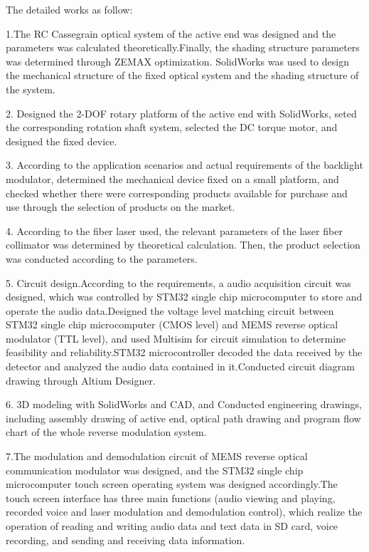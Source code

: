The detailed works as follow:

1.The RC Cassegrain  optical system of the active end was designed and the parameters was calculated theoretically.Finally, the shading structure parameters was determined through ZEMAX optimization. SolidWorks was used to design the mechanical structure of the fixed optical system and the shading structure of the system.

2. Designed the 2-DOF rotary platform of the active end with SolidWorks, seted the corresponding rotation shaft system, selected the DC torque motor, and designed the fixed device.

3. According to the application scenarios and actual requirements of the backlight modulator, determined the mechanical device fixed on a small platform, and checked whether there were corresponding products available for purchase and use through the selection of products on the market. 


4. According to the fiber laser used, the relevant parameters of the laser fiber collimator was determined by theoretical calculation. Then, the product selection was conducted according to the parameters. 

5. Circuit design.According to the requirements, a audio acquisition circuit was designed, which was controlled by STM32 single chip microcomputer to store and operate the audio data.Designed the voltage level matching circuit between STM32 single chip microcomputer (CMOS level) and MEMS reverse optical modulator (TTL level), and used Multisim for circuit simulation to determine feasibility and reliability.STM32 microcontroller decoded the data received by the detector and analyzed the audio data contained in it.Conducted circuit diagram drawing through Altium Designer. 

6. 3D modeling with SolidWorks and CAD, and Conducted engineering drawings, including assembly drawing of active end, optical path drawing and program flow chart of the whole reverse modulation system.

7.The modulation and demodulation circuit of MEMS reverse optical communication modulator was designed, and the STM32 single chip microcomputer touch screen operating system was designed accordingly.The touch screen interface has three main functions (audio viewing and playing, recorded voice and laser modulation and demodulation control), which realize the operation of reading and writing audio data and text data in SD card, voice recording, and sending and receiving data information.


